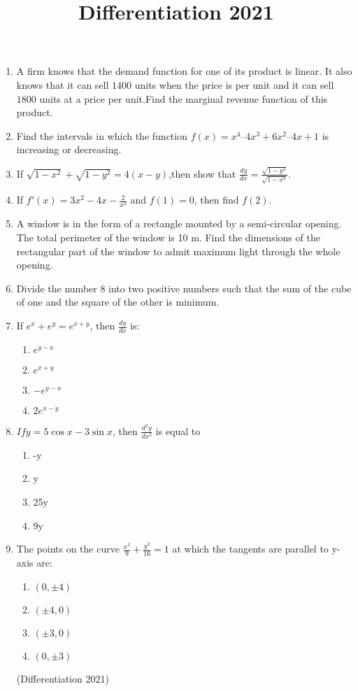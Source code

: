 \documentclass{article}
\begin{document}
\title{\textbf{Differentiation 2021}}
\date{}
\begin{enumerate}
	\item A firm knows that the demand function for one of its product is linear. It also knows that it can sell $1400$ units when the price is  per unit and it can sell $1800$ units at a price  per unit.Find the marginal revenue function of this product.

\item Find the intervals in which the function $f(x) = x^{4}–4x^{3}+6x^{2}–4x+1$ is increasing or decreasing.

\item If $\sqrt{1-x^{2}}+\sqrt{1-y^{2}}=4(x-y)$,then show that $\frac{dy}{dx}=\frac{\sqrt{1-y^{2}}}{\sqrt{1-x^{2}}}$.


\item If $f'(x)=3x^{2}-4x-\frac{2}{x^{3}}$ and $f(1)=0$, then find $f(2)$.

\item A window is in the form of a rectangle mounted by a semi-circular opening. The total perimeter of the window is 10 m. Find the dimensions of the rectangular part of the window to admit maximum light through the whole opening.

\item Divide the number 8 into two positive numbers such that the sum of the cube of one and the square of the other is minimum.

\item If $e^{x}+e^{y}=e^{x+y}$, then $\frac{dy}{dx}$ is:
\begin{enumerate}
\item $e^{y-x}$
\item $e^{x+y}$
\item $-e^{y-x}$
\item $2 e^{x-y}$
\end{enumerate}

\item $If y=5\cos x-3\sin x$, then $\frac{d^{2}y}{dx^{2}}$ is equal to
\begin{enumerate}
\item -y
\item y
\item 25y
\item 9y
\end{enumerate}

\item The points on the curve $\frac{x^2}{9}+\frac{y^2}{16}=1$ at which the tangents are parallel to y-axis are:
\begin{enumerate}

\item $(0,\pm 4)$
\item $(\pm 4,0)$
\item $(\pm 3,0)$
\item $(0,\pm 3)$

\end{enumerate}
	\hfill{(Differentiation 2021)}
\end{enumerate}
\end{document}
